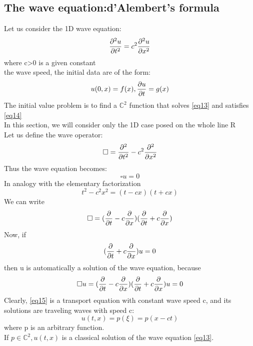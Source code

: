 \subsection{The wave equation:d'Alembert's formula}
Let us consider the 1D wave equation:
\begin{equation}
    \label{eq13} \pdv[2]{u}{t}=c^2\pdv[2]{u}{x}
\end{equation}
where c>0 is a given constant\\
the wave speed, the initial data are of the form:
\begin{equation}
    \label{eq14} u(0,x)=f(x),\pdv{u}{t}(0,x)=g(x)
\end{equation}
The initial value problem is to find a $ \mathbb{C}^2 $ function that solves \eqref{eq13} and satisfies \eqref{eq14}\\
In this section, we will consider only the 1D case posed on the whole line R\\
Let us define the wave operator:
$$
    \square =\pdv[2]{}{t}-c^2\pdv[2]{}{x}
$$ 
Thus the wave equation becomes:
$$
    \square u=0
$$
In analogy with the elementary factorization
$$
    t^2-c^2x^2=(t-cx)(t+cx)
$$ 
We can write 
$$
    \square=(\pdv{}{t}-c\pdv{}{x})(\pdv{}{t}+c\pdv{}{x})
$$
Now, if
\begin{equation}
     \label{eq15}(\pdv{}{t}+c\pdv{}{x})u=0
\end{equation}
then u is automatically a solution of the wave equation, because
$$
    \square u=(\pdv{}{t}-c\pdv{}{x})(\pdv{}{t}+c\pdv{}{x})u=0
$$
Clearly, \eqref{eq15} is a transport equation with constant wave speed c, and its solutions are traveling waves with speed c:
$$
    u(t,x)=p(\xi)=p(x-ct)
$$
where p is an arbitrary function.\\
If $ p\in \mathbb{C}^2,u(t,x) $ is a classical solution of the wave equation \eqref{eq13}.\\
